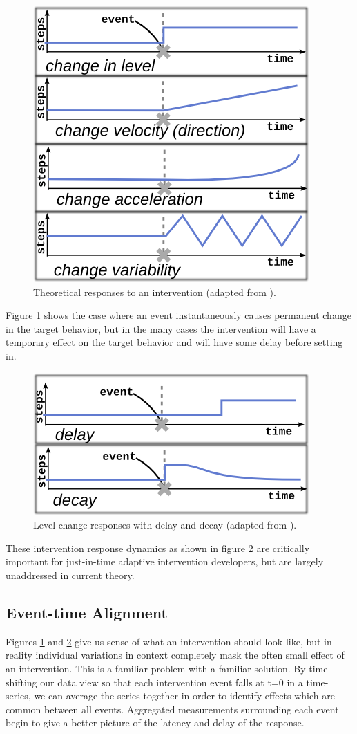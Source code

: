 \documentclass[preprint,journal]{vgtc}       %
\begin{document}
\begin{figure}
\centering
\includegraphics[width=0.6\columnwidth]{./img/exampleDynamicSignals.png}
\caption{Theoretical responses to an intervention (adapted from \cite{glass1975}).}
\label{fig:exampleSignals}
\end{figure}

Figure \ref{fig:exampleSignals} shows the case where an event instantaneously causes permanent change in the target behavior, but in the many cases the intervention will have a temporary effect on the target behavior and will have some delay before setting in. 

\begin{figure}
\centering
\includegraphics[width=0.6\columnwidth]{./img/exampleDynamicComplications.png}
\caption{Level-change responses with delay and decay (adapted from \cite{glass1975}).}
\label{fig:exampleComplications}
\end{figure}

These intervention response dynamics as shown in figure \ref{fig:exampleComplications} are critically important for just-in-time adaptive intervention developers, but are largely unaddressed in current theory.

\subsection{Event-time Alignment}
Figures \ref{fig:exampleSignals} and \ref{fig:exampleComplications} give us sense of what an intervention should look like, but in reality individual variations in context completely mask the often small effect of an intervention. 
This is a familiar problem with a familiar solution. 
By time-shifting our data view so that each intervention event falls at t=0 in a time-series, we can average the series together in order to identify effects which are common between all events.
Aggregated measurements surrounding each event begin to give a better picture of the latency and delay of the response.
\end{document}
